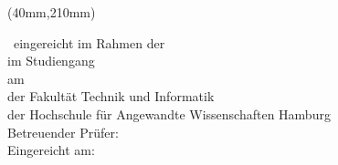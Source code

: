 %
%
\newpage
\thispagestyle{empty}
{\selectfont

  \vspace*{1cm}
  \begin{minipage}[b]{\textwidth}
    \fontsize{14pt}{20pt}
    \selectfont
    \begin{center}
      \IthesisAuthor
    \end{center}
  \end{minipage}

  \vspace{1.5cm}
  \begin{minipage}[b][0cm][b]{\textwidth}
    \fontsize{18pt}{20pt}
    \selectfont
    \begin{center}
      \IthesisTitle  	  
  	\end{center}
  \end{minipage}

  \begin{textblock*}{\textwidth}(40mm,210mm)
    \begin{minipage}[b]{\textwidth}
      \selectfont
      \fontsize{12pt}{14pt}
      \selectfont
      \IthesisKindDE ~eingereicht im Rahmen der \IthesisExaminationDE \\

      im Studiengang \IstudyCourseName \\
      am \IthesisDepartmentFull \\
      der Fakultät Technik und Informatik\\
      der Hochschule für Angewandte Wissenschaften Hamburg\\

      Betreuender Prüfer: \IfirstSv \\

      Eingereicht am: \ISubDate \\
    \end{minipage}
  \end{textblock*}
}
